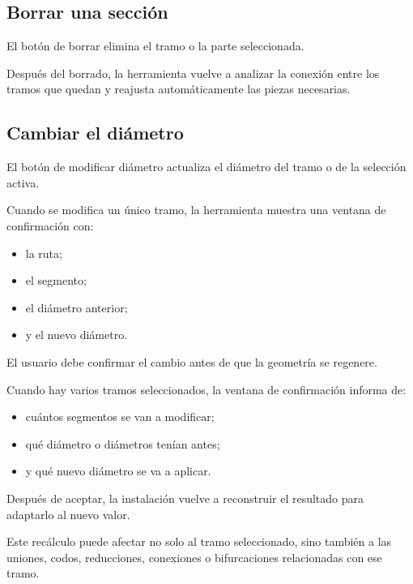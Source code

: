 \subsection{Borrar una sección}

El botón de borrar elimina el tramo o la parte seleccionada.

Después del borrado, la herramienta vuelve a analizar la conexión entre los tramos que quedan y reajusta automáticamente las piezas necesarias.

\subsection{Cambiar el diámetro}
\label{sec:cambiar-diametro}

El botón de modificar diámetro actualiza el diámetro del tramo o de la selección activa.

Cuando se modifica un único tramo, la herramienta muestra una ventana de confirmación con:

\begin{itemize}
\item la ruta;
\item el segmento;
\item el diámetro anterior;
\item y el nuevo diámetro.
\end{itemize}

El usuario debe confirmar el cambio antes de que la geometría se regenere.


Cuando hay varios tramos seleccionados, la ventana de confirmación informa de:

\begin{itemize}
\item cuántos segmentos se van a modificar;
\item qué diámetro o diámetros tenían antes;
\item y qué nuevo diámetro se va a aplicar.
\end{itemize}


Después de aceptar, la instalación vuelve a reconstruir el resultado para adaptarlo al nuevo valor.

Este recálculo puede afectar no solo al tramo seleccionado, sino también a las uniones, codos, reducciones, conexiones o bifurcaciones relacionadas con ese tramo.

